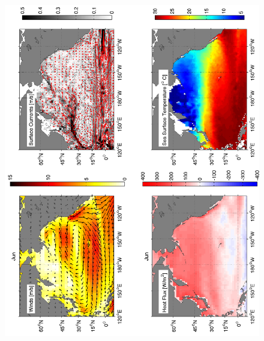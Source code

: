 \begin{figure}[hbt]
  \begin{center}
  \includegraphics[angle=270]{figs/WindOverview/SurfaceCurrents06}
    \caption{}
    \label{fig:}  
  \end{center}
\end{figure}

